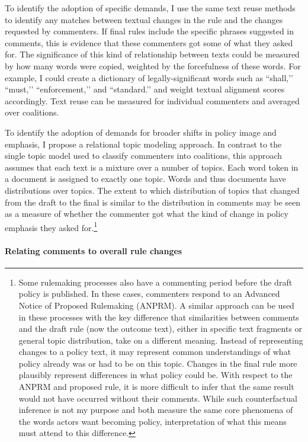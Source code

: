 To identify the adoption of specific demands, I use the same text reuse methods to identify any matches between textual changes in the rule and the changes requested by commenters. If final rules include the specific phrases suggested in comments, this is evidence that these commenters got some of what they asked for. The significance of this kind of relationship between texts could be measured by how many words were copied, weighted by the forcefulness of these words. For example, I could create a dictionary of legally-significant words such as ``shall,’’ ``must,’’ ``enforcement,’’ and ``standard.’’ and weight textual alignment scores accordingly. Text reuse can be measured for individual commenters and averaged over coalitions. 

To identify the adoption of demands for broader shifts in policy image and emphasis, I propose a relational topic modeling approach. In contrast to the single topic model used to classify commenters into coalitions, this approach assumes that each text is a mixture over a number of topics. Each word token in a document is assigned to exactly one topic. Words and thus documents have distributions over topics. The extent to which distribution of topics that changed from the draft to the final is similar to the distribution in comments may be seen as a measure of whether the commenter got what the kind of change in policy emphasis they asked for.\footnote{
Some rulemaking processes also have a commenting period before the draft policy is published. In these cases, commenters respond to an Advanced Notice of Proposed Rulemaking (ANPRM). A similar approach can be used in these processes with the key difference that similarities between comments and the draft rule (now the outcome text), either in specific text fragments or general topic distribution, take on a different meaning. Instead of representing changes to a policy text, it may represent common understandings of what policy already was or had to be on this topic. Changes in the final rule more plausibly represent differences in what policy could be. With respect to the ANPRM and proposed rule, it is more difficult to infer that the same result would not have occurred without their comments. While such counterfactual inference is not my purpose and both measure the same core phenomena of the words actors want becoming policy, interpretation of what this means must attend to this difference.}

\paragraph{Relating comments to overall rule changes}

